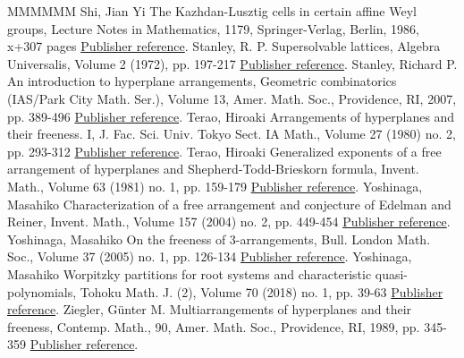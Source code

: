 \begin{thebibliography}{MMMMMM}
 Shi, Jian Yi The Kazhdan-Lusztig cells in certain affine Weyl groups, Lecture Notes in Mathematics, 1179, Springer-Verlag, Berlin, 1986, x+307 pages \href{https://alco.centre-mersenne.org/articles/10.5802/alco.405/#Shi86}{Publisher reference}.
 Stanley, R. P. Supersolvable lattices, Algebra Universalis, Volume 2 (1972), pp. 197-217 \href{https://alco.centre-mersenne.org/articles/10.5802/alco.405/#St72}{Publisher reference}.
 Stanley, Richard P. An introduction to hyperplane arrangements, Geometric combinatorics (IAS/Park City Math. Ser.), Volume 13, Amer. Math. Soc., Providence, RI, 2007, pp. 389-496 \href{https://alco.centre-mersenne.org/articles/10.5802/alco.405/#St07}{Publisher reference}.
 Terao, Hiroaki Arrangements of hyperplanes and their freeness. I, J. Fac. Sci. Univ. Tokyo Sect. IA Math., Volume 27 (1980) no. 2, pp. 293-312 \href{https://alco.centre-mersenne.org/articles/10.5802/alco.405/#T80}{Publisher reference}.
 Terao, Hiroaki Generalized exponents of a free arrangement of hyperplanes and Shepherd-Todd-Brieskorn formula, Invent. Math., Volume 63 (1981) no. 1, pp. 159-179 \href{https://alco.centre-mersenne.org/articles/10.5802/alco.405/#T81}{Publisher reference}.
 Yoshinaga, Masahiko Characterization of a free arrangement and conjecture of Edelman and Reiner, Invent. Math., Volume 157 (2004) no. 2, pp. 449-454 \href{https://alco.centre-mersenne.org/articles/10.5802/alco.405/#Yo04}{Publisher reference}.
 Yoshinaga, Masahiko On the freeness of 3-arrangements, Bull. London Math. Soc., Volume 37 (2005) no. 1, pp. 126-134 \href{https://alco.centre-mersenne.org/articles/10.5802/alco.405/#Yo05}{Publisher reference}.
 Yoshinaga, Masahiko Worpitzky partitions for root systems and characteristic quasi-polynomials, Tohoku Math. J. (2), Volume 70 (2018) no. 1, pp. 39-63 \href{https://alco.centre-mersenne.org/articles/10.5802/alco.405/#Y18W}{Publisher reference}.
 Ziegler, Günter M. Multiarrangements of hyperplanes and their freeness, Contemp. Math., 90, Amer. Math. Soc., Providence, RI, 1989, pp. 345-359 \href{https://alco.centre-mersenne.org/articles/10.5802/alco.405/#Z89}{Publisher reference}.
\end{thebibliography}
